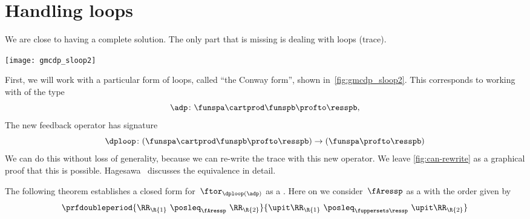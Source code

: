 \section{Handling loops}

We are close to having a complete solution.
The only part that is missing is dealing with loops (trace).

\begin{marginfigure}
    \texttt{[image: gmcdp\_sloop2]}
    \caption{}
    \label{fig:gmcdp_sloop2}
\end{marginfigure}

First, we will work with a particular form of loops, called ``the Conway form'',
shown in~\cref{fig:gmcdp_sloop2}.
This corresponds to working with  of the type
\begin{equation}
    \adp \colon \funspa \cartprod \funspb  \profto \resspb,
\end{equation}
The new feedback operator has signature
\begin{equation}
    \dploop\colon (\funspa \cartprod \funspb \profto \resspb) \to (\funspa \profto \resspb)
\end{equation}
%
We can do this without loss of generality, because we can re-write the trace
with this new operator.
We leave \cref{fig:can-rewrite} as a graphical proof that this is possible.
Hagesawa~\cite{hasegawa02uniformity} discusses the equivalence in detail.

\begin{figure*}[h]
    \hspace*{\fill}
    \hspace*{\fill}
    \hspace*{\fill}
    \caption{We can rewrite the trace in Conway's form.}
    \label{fig:can-rewrite}
\end{figure*}

The following theorem establishes a closed form for~$\ftor_{\dploop(\adp)}$ as a .
Here on we consider~$\fAressp$ as a  with the order given by
\begin{equation}
    \prfdoubleperiod{
        \RR_\R{1} \  \posleq_{\fAressp} \ \RR_\R{2}
    }{
        \upit \RR_\R{1} \ \posleq_{\fuppersets \ressp}\  \upit \RR_\R{2}
    }
\end{equation}

